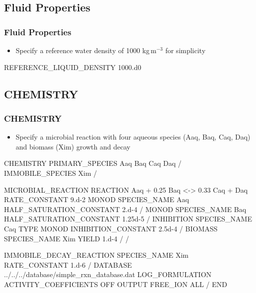 \documentclass{beamer}
\begin{document}
\subsection{Fluid Properties}
\begin{frame}\frametitle{Fluid Properties}

\begin{itemize}
  \item Specify a reference water density of 1000 kg\,m$^{-3}$ for simplicity
\end{itemize}

\begin{semiverbatim}




REFERENCE_LIQUID_DENSITY 1000.d0

\end{semiverbatim}

\end{frame}

\subsection{CHEMISTRY}

\begin{frame}\frametitle{CHEMISTRY}

\begin{itemize}
  \item Specify a microbial reaction with four aqueous species (Aaq, Baq, Caq, Daq) and biomass (Xim) growth and decay
\end{itemize}

\begin{semiverbatim}

CHEMISTRY
  PRIMARY_SPECIES
    Aaq
    Baq
    Caq
    Daq
  /
  IMMOBILE_SPECIES
    Xim
  /
\end{semiverbatim}
\newpage
\scriptsize
\begin{semiverbatim}
  MICROBIAL_REACTION
    REACTION Aaq + 0.25 Baq <-> 0.33 Caq + Daq
    RATE_CONSTANT 9.d-2
    MONOD
      SPECIES_NAME Aaq
      HALF_SATURATION_CONSTANT 2.d-4
    /
    MONOD
      SPECIES_NAME Baq
      HALF_SATURATION_CONSTANT 1.25d-5
    /
    INHIBITION
      SPECIES_NAME Caq
      TYPE MONOD
      INHIBITION_CONSTANT 2.5d-4
    /
    BIOMASS
      SPECIES_NAME Xim
      YIELD 1.d-4
    /
  /
\end{semiverbatim}
\normalsize
\begin{semiverbatim}
  IMMOBILE_DECAY_REACTION
    SPECIES_NAME Xim
    RATE_CONSTANT 1.d-6
  /
  DATABASE ../../../database/simple_rxn_database.dat
  LOG_FORMULATION
  ACTIVITY_COEFFICIENTS OFF
  OUTPUT
    FREE_ION
    ALL
  /
END
\end{semiverbatim}

\end{frame}
\end{document}
